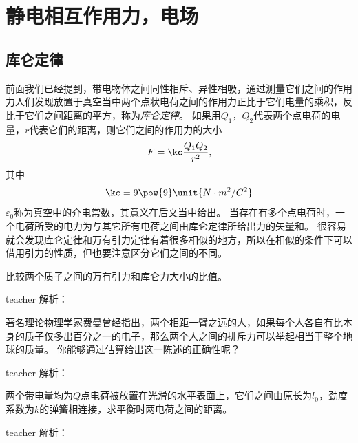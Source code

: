 \section{静电相互作用力，电场}
\subsection{库仑定律}

前面我们已经提到，带电物体之间同性相斥、异性相吸，通过测量它们之间的作用力人们发现放置于真空当中两个点状电荷之间的作用力正比于它们电量的乘积，反比于它们之间距离的平方，称为\emph{库仑定律}。
如果用$Q_1$，$Q_2$代表两个点电荷的电量，$r$代表它们的距离，则它们之间的作用力的大小
\begin{equation}\label{eqn： coulomb's law}
F = \kc \frac{Q_1Q_2}{r^2},
\end{equation}
其中
\begin{equation}
\kc = 9\pow{9}\unit{N\cdot m^2/C^2}
\end{equation}
$\varepsilon_0$称为真空中的介电常数，其意义在后文当中给出。
当存在有多个点电荷时，一个电荷所受的电力为与其它所有电荷之间由库仑定律所给出力的矢量和。
很容易就会发现库仑定律和万有引力定律有着很多相似的地方，所以在相似的条件下可以借用引力的性质，但也要注意区分它们之间的不同。

\begin{example}
比较两个质子之间的万有引力和库仑力大小的比值。
\begin{taggedblock}{teacher}
\newline
解析：
\end{taggedblock}
\end{example}

\begin{example}
著名理论物理学家费曼曾经指出，两个相距一臂之远的人，如果每个人各自有比本身的质子仅多出百分之一的电子，那么两个人之间的排斥力可以举起相当于整个地球的质量。
你能够通过估算给出这一陈述的正确性呢？
\begin{taggedblock}{teacher}
\newline
解析：
\end{taggedblock}
\end{example}

\begin{example}
两个带电量均为$Q$点电荷被放置在光滑的水平表面上，它们之间由原长为$l_0$，劲度系数为$k$的弹簧相连接，求平衡时两电荷之间的距离。
\begin{taggedblock}{teacher}
\newline
解析：
\end{taggedblock}
\end{example}

